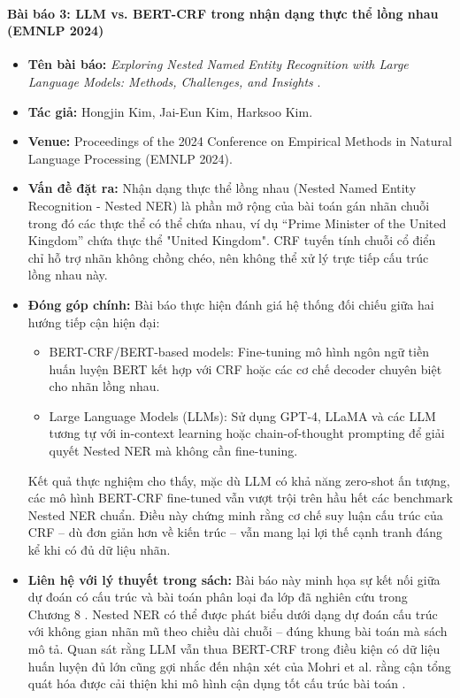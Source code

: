 \begin{expandbox}
\paragraph{Bài báo 3: LLM vs. BERT-CRF trong nhận dạng thực thể lồng nhau (EMNLP 2024)}
\begin{itemize}[leftmargin=2em]
    \item \textbf{Tên bài báo:} \textit{Exploring Nested Named Entity Recognition with Large Language Models: Methods, Challenges, and Insights} \cite{kim2024nested_ner}.
    \item \textbf{Tác giả:} Hongjin Kim, Jai-Eun Kim, Harksoo Kim.
    \item \textbf{Venue:} Proceedings of the 2024 Conference on Empirical Methods in Natural Language Processing (EMNLP 2024).
    \item \textbf{Vấn đề đặt ra:} Nhận dạng thực thể lồng nhau (Nested Named Entity Recognition - Nested NER) là phần mở rộng của bài toán gán nhãn chuỗi trong đó các thực thể có thể chứa nhau, ví dụ “Prime Minister of the United Kingdom” chứa thực thể "United Kingdom". CRF tuyến tính chuỗi cổ điển chỉ hỗ trợ nhãn không chồng chéo, nên không thể xử lý trực tiếp cấu trúc lồng nhau này.
    \item \textbf{Đóng góp chính:} Bài báo thực hiện đánh giá hệ thống đối chiếu giữa hai hướng tiếp cận hiện đại:
    \begin{itemize}
        \item BERT-CRF/BERT-based models: Fine-tuning mô hình ngôn ngữ tiền huấn luyện BERT kết hợp với CRF hoặc các cơ chế decoder chuyên biệt cho nhãn lồng nhau.
        \item Large Language Models (LLMs): Sử dụng GPT-4, LLaMA và các LLM tương tự với in-context learning hoặc chain-of-thought prompting để giải quyết Nested NER mà không cần fine-tuning.
    \end{itemize}
    Kết quả thực nghiệm cho thấy, mặc dù LLM có khả năng zero-shot ấn tượng, các mô hình BERT-CRF fine-tuned vẫn vượt trội trên hầu hết các benchmark Nested NER chuẩn. Điều này chứng minh rằng cơ chế suy luận cấu trúc của CRF -- dù đơn giản hơn về kiến trúc -- vẫn mang lại lợi thế cạnh tranh đáng kể khi có đủ dữ liệu nhãn.
    \item \textbf{Liên hệ với lý thuyết trong sách:} Bài báo này minh họa sự kết nối giữa dự đoán có cấu trúc và bài toán phân loại đa lớp đã nghiên cứu trong Chương 8 \cite{mohri2018foundations}. Nested NER có thể được phát biểu dưới dạng dự đoán cấu trúc với không gian nhãn mũ theo chiều dài chuỗi -- đúng khung bài toán mà sách mô tả. Quan sát rằng LLM vẫn thua BERT-CRF trong điều kiện có dữ liệu huấn luyện đủ lớn cũng gợi nhắc đến nhận xét của Mohri et al. rằng cận tổng quát hóa được cải thiện khi mô hình cận dụng tốt cấu trúc bài toán \cite{mohri2018foundations}.
\end{itemize}


\end{expandbox}
